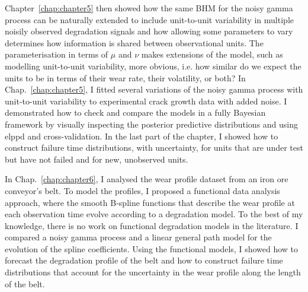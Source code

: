 Chapter~\ref{chap:chapter5} then showed how the same BHM for the noisy gamma process can be naturally extended to include unit-to-unit variability in multiple noisily observed degradation signals and how allowing some parameters to vary determines how information is shared between observational units. The parameterisation in terms of $\mu$ and $\nu$ makes extensions of the model, such as modelling unit-to-unit variability, more obvious, i.e. how similar do we expect the units to be in terms of their wear rate, their volatility, or both? In Chap.~\ref{chap:chapter5}, I fitted several variations of the noisy gamma process with unit-to-unit variability to experimental crack growth data with added noise. I demonstrated how to check and compare the models in a fully Bayesian framework by visually inspecting the posterior predictive distributions and using elppd and cross-validation. In the last part of the chapter, I showed how to construct failure time distributions, with uncertainty, for units that are under test but have not failed and for new, unobserved units.

In Chap.~\ref{chap:chapter6}, I analysed the wear profile dataset from an iron ore conveyor's belt. To model the profiles, I proposed a functional data analysis approach, where the smooth B-spline functions that describe the wear profile at each observation time evolve according to a degradation model. To the best of my knowledge, there is no work on functional degradation models in the literature. I compared a noisy gamma process and a linear general path model for the evolution of the spline coefficients. Using the functional models, I showed how to forecast the degradation profile of the belt and how to construct failure time distributions that account for the uncertainty in the wear profile along the length of the belt.


